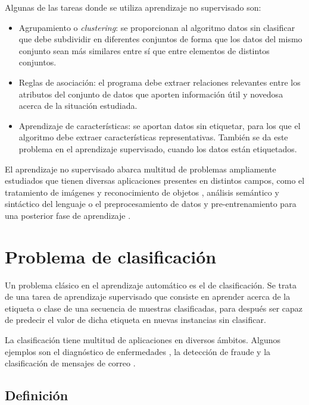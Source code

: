 Algunas de las tareas donde se utiliza aprendizaje no supervisado son:
\begin{itemize}
\item Agrupamiento o
\emph{clustering}: se proporcionan al algoritmo datos sin
clasificar que debe subdividir en diferentes conjuntos de forma que los
datos del mismo conjunto sean más similares entre sí que entre elementos
de distintos conjuntos.
\item Reglas de asociación: el programa debe extraer relaciones relevantes entre los
  atributos del conjunto de datos que aporten información útil y novedosa acerca de la
  situación estudiada.
\item Aprendizaje de características: se aportan datos sin etiquetar, para los que el algoritmo debe extraer características representativas. También se da este problema en el aprendizaje supervisado, cuando los datos están etiquetados.
\end{itemize}

El aprendizaje no supervisado abarca multitud de problemas ampliamente
estudiados que tienen diversas aplicaciones presentes en distintos
campos, como el tratamiento de imágenes y reconocimiento de objetos
\autocite{ranzato}, análisis semántico \autocite{hofmann} y sintáctico
del lenguaje \autocite{brent} o el preprocesamiento de datos y
pre-entrenamiento para una posterior fase de aprendizaje
\autocite{erhan2009}.

\section{Problema de clasificación}\label{sec:clasif}

Un problema clásico en el aprendizaje automático es el de clasificación. Se trata de una tarea de aprendizaje supervisado que consiste en aprender acerca de la etiqueta o clase de una secuencia de muestras clasificadas, para después ser capaz de predecir el valor de dicha etiqueta en nuevas instancias sin clasificar.

La clasificación tiene multitud de aplicaciones en diversos ámbitos.
Algunos ejemplos son el diagnóstico de enfermedades \autocite{kononenko2001}, la
detección de fraude \autocite{phua2010} y la clasificación de mensajes de correo \autocite{cohen1996}.

\subsection{Definición}

